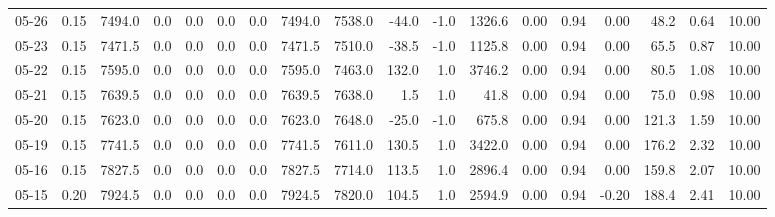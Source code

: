 \begin{threeparttable}
{\begin{tabular}{lrrrrrrrrrrrrrrrrr}
  05-26 &     0.15 & 7494.0 &               0.0 &               0.0 &                0.0 &                0.0 & 7494.0 & 7538.0 &      -44.0 &                     -1.0 &              1326.6 &       0.00 &      0.94 &           0.00 &             48.2 &            0.64 &                  10.00 \\
  05-23 &     0.15 & 7471.5 &               0.0 &               0.0 &                0.0 &                0.0 & 7471.5 & 7510.0 &      -38.5 &                     -1.0 &              1125.8 &       0.00 &      0.94 &           0.00 &             65.5 &            0.87 &                  10.00 \\
  05-22 &     0.15 & 7595.0 &               0.0 &               0.0 &                0.0 &                0.0 & 7595.0 & 7463.0 &      132.0 &                      1.0 &              3746.2 &       0.00 &      0.94 &           0.00 &             80.5 &            1.08 &                  10.00 \\
  05-21 &     0.15 & 7639.5 &               0.0 &               0.0 &                0.0 &                0.0 & 7639.5 & 7638.0 &        1.5 &                      1.0 &                41.8 &       0.00 &      0.94 &           0.00 &             75.0 &            0.98 &                  10.00 \\
  05-20 &     0.15 & 7623.0 &               0.0 &               0.0 &                0.0 &                0.0 & 7623.0 & 7648.0 &      -25.0 &                     -1.0 &               675.8 &       0.00 &      0.94 &           0.00 &            121.3 &            1.59 &                  10.00 \\
  05-19 &     0.15 & 7741.5 &               0.0 &               0.0 &                0.0 &                0.0 & 7741.5 & 7611.0 &      130.5 &                      1.0 &              3422.0 &       0.00 &      0.94 &           0.00 &            176.2 &            2.32 &                  10.00 \\
  05-16 &     0.15 & 7827.5 &               0.0 &               0.0 &                0.0 &                0.0 & 7827.5 & 7714.0 &      113.5 &                      1.0 &              2896.4 &       0.00 &      0.94 &           0.00 &            159.8 &            2.07 &                  10.00 \\
  05-15 &     0.20 & 7924.5 &               0.0 &               0.0 &                0.0 &                0.0 & 7924.5 & 7820.0 &      104.5 &                      1.0 &              2594.9 &       0.00 &      0.94 &          -0.20 &            188.4 &            2.41 &                  10.00 \\

\end{tabular}}
\end{threeparttable}
